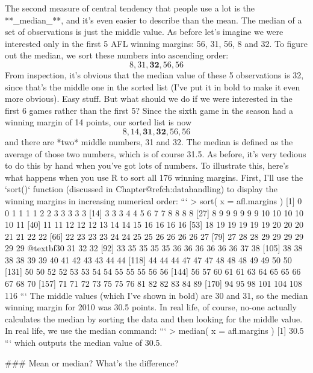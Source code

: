 The second measure of central tendency that people use a lot is the **_median_**, and it's even easier to describe than the mean. The median of a set of observations is just the middle value. As before let's imagine we were interested only in the first 5 AFL winning margins: 56, 31, 56, 8 and 32. To figure out the median, we sort these numbers into ascending order:
$$
8, 31, \mathbf{32}, 56, 56
$$
From inspection, it's obvious that the median value of these 5 observations is 32, since that's the middle one in the sorted list (I've put it in bold to make it even more obvious). Easy stuff. But what should we do if we were interested in the first 6 games rather than the first 5? Since the sixth game in the season had a winning margin of 14 points, our sorted list is now 
$$
8, 14, \mathbf{31}, \mathbf{32}, 56, 56
$$
and there are *two* middle numbers, 31 and 32. The median is defined as the average of those two numbers, which is of course 31.5. As before, it's very tedious to do this by hand when you've got lots of numbers. To illustrate this, here's what happens when you use R to sort all 176 winning margins. First, I'll use the `sort()` function (discussed in Chapter@refch:datahandling) to display the winning margins in increasing numerical order:
```
> sort( x = afl.margins )
  [1]   0   0   1   1   1   1   2   2   3   3   3   3   3
 [14]   3   3   3   4   4   5   6   7   7   8   8   8   8
 [27]   8   9   9   9   9   9   9  10  10  10  10  10  11
 [40]  11  11  12  12  12  13  14  14  15  16  16  16  16
 [53]  18  19  19  19  19  19  20  20  20  21  21  22  22
 [66]  22  23  23  23  24  24  25  25  26  26  26  26  27
 [79]  27  28  28  29  29  29  29  29  29  @textbf{30  31}  32  32
 [92]  33  35  35  35  35  36  36  36  36  36  36  37  38
[105]  38  38  38  38  39  39  40  41  42  43  43  44  44
[118]  44  44  44  47  47  47  48  48  48  49  49  50  50
[131]  50  50  52  52  53  53  54  54  55  55  55  56  56
[144]  56  57  60  61  61  63  64  65  65  66  67  68  70
[157]  71  71  72  73  75  75  76  81  82  82  83  84  89
[170]  94  95  98 101 104 108 116
```
The middle values (which I've shown in bold) are 30 and 31, so the median winning margin for 2010 was 30.5 points. In real life, of course, no-one actually calculates the median by sorting the data and then looking for the middle value. In real life, we use the median command:
```
> median( x = afl.margins )
[1] 30.5
```
which outputs the median value of 30.5. 




### Mean or median? What's the difference?

